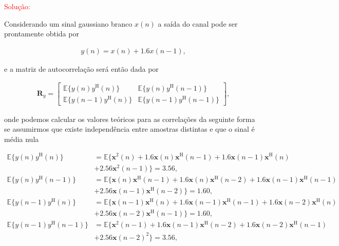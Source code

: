 \documentclass[a4paper,10pt]{article}
\begin{document}
\begin{enumerate}
\begin{enumerate}
						\textcolor{red}{Solução:}
						
						Considerando um sinal gaussiano branco $x(n)$ a saída do canal pode ser prontamente obtida por
						
						\begin{align}
							y(n) = x(n) + 1.6 x(n - 1),
						\end{align}
						
						e a matriz de autocorrelação será então dada por
						
						\begin{align}
							\mathbf{R}_{y} =
							\begin{bmatrix}
								\mathbb{E}\{y(n)y^{\text{H}}(n)\} & \mathbb{E}\{y(n)y^{\text{H}}(n - 1)\} \\
								\mathbb{E}\{y(n - 1)y^{\text{H}}(n)\} & \mathbb{E}\{y(n - 1)y^{\text{H}}(n - 1)\}
							\end{bmatrix},
						\end{align}
						
						onde podemos calcular os valores teóricos para as correlações da seguinte forma se assumirmos que existe independência entre amostras distintas e que o sinal é média nula 
						
						\begin{align*}
							\mathbb{E}\{y(n)y^{\text{H}}(n)\} &= \mathbb{E}\{ \mathbf{x}^{2}(n) + 1.6 \mathbf{x}(n) \mathbf{x}^{\text{H}}(n - 1) + 1.6 \mathbf{x}(n - 1) \mathbf{x}^{\text{H}} (n) \\
							&+ 2.56 \mathbf{x}^{2}(n - 1) \} = 3.56, \\
							\mathbb{E}\{y(n)y^{\text{H}}(n - 1)\} &= \mathbb{E}\{ \mathbf{x}(n) \mathbf{x}^{\text{H}}(n - 1) + 1.6 \mathbf{x}(n) \mathbf{x}^{\text{H}}(n - 2) + 1.6 \mathbf{x}(n - 1) \mathbf{x}^{\text{H}} (n - 1) \\ 
							&+ 2.56 \mathbf{x}(n - 1) \mathbf{x}^{\text{H}}(n - 2) \} = 1.60, \\
							\mathbb{E}\{y(n - 1)y^{\text{H}}(n)\} &= \mathbb{E}\{ \mathbf{x}(n - 1) \mathbf{x}^{\text{H}}(n) + 1.6 \mathbf{x}(n - 1) \mathbf{x}^{\text{H}}(n - 1) + 1.6 \mathbf{x}(n - 2) \mathbf{x}^{\text{H}} (n) \\ 
							&+ 2.56 \mathbf{x}(n - 2) \mathbf{x}^{\text{H}}(n - 1) \} = 1.60, \\
							\mathbb{E}\{y(n - 1)y^{\text{H}}(n - 1)\} &= \mathbb{E}\{ \mathbf{x}^{2}(n - 1) + 1.6 \mathbf{x}(n - 1) \mathbf{x}^{\text{H}}(n - 2) + 1.6 \mathbf{x}(n - 2) \mathbf{x}^{\text{H}} (n - 1) \\ 
							&+ 2.56 \mathbf{x}(n - 2)^{2} \} = 3.56, \\
						\end{align*}
						

\end{enumerate}
\end{enumerate}
\end{document}
